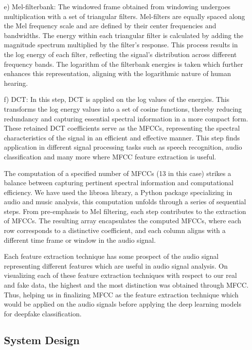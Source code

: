 \documentclass[conference]{IEEEtran}
\begin{document}
e) Mel-filterbank: The windowed frame obtained from windowing undergoes multiplication with a set of triangular filters. Mel-filters are equally spaced along the Mel frequency scale and are defined by their center frequencies and bandwidths. The energy within each triangular filter is calculated by adding the magnitude spectrum multiplied by the filter's response. This process results in the log energy of each filter, reflecting the signal's distribution across different frequency bands. The logarithm of the filterbank energies is taken which further enhances this representation, aligning with the logarithmic nature of human hearing. 

f) DCT: In this step, DCT is applied on the log values of the energies. This transforms the log energy values into a set of cosine functions, thereby reducing redundancy and capturing essential spectral information in a more compact form. These retained DCT coefficients serve as the MFCCs, representing the spectral characteristics of the signal in an efficient and effective manner. This step finds application in different signal processing tasks such as speech recognition, audio classification and many more where MFCC feature extraction is useful. 


The computation of a specified number of MFCCs (13 in this case) strikes a balance between capturing pertinent spectral information and computational efficiency. We have used the librosa library, a Python package specializing in audio and music analysis, this computation unfolds through a series of sequential steps. From pre-emphasis to Mel filtering, each step contributes to the extraction of MFCCs. The resulting array encapsulates the computed MFCCs, where each row corresponds to a distinctive coefficient, and each column aligns with a different time frame or window in the audio signal. 
   
Each feature extraction technique has some prospect of the audio signal representing different features which are useful in audio signal analysis. On visualizing each of these feature extraction techniques with respect to our real and fake data, the highest and the most distinction was obtained through MFCC. Thus, helping us in finalizing MFCC as the feature extraction technique which would be applied on the audio signals before applying the deep learning models for deepfake classification.




\subsection{System Design}\label{AA}
\end{document}
